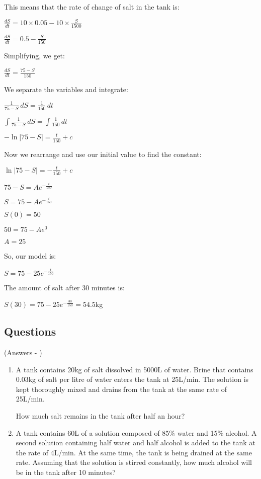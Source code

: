 \documentclass[../main.tex]{subfiles}
\begin{document}
This means that the rate of change of salt in the tank is:

$\frac{dS}{dt}=10 \times 0.05 - 10 \times \frac{S}{1500}$

$\frac{dS}{dt}=0.5 - \frac{S}{150}$

Simplifying, we get:

$\frac{dS}{dt}=\frac{75-S}{150}$

We separate the variables and integrate:

$\frac{1}{75-S}\,dS=\frac{1}{150}\,dt$

$\int \frac{1}{75-S}\,dS=\int \frac{1}{150}\,dt$

$-\ln|75-S|=\frac{t}{150}+c$

Now we rearrange and use our initial value to find the constant:

$\ln|75-S|=-\frac{t}{150}+c$

$75-S=Ae^{-\frac{t}{150}}$

$S=75-Ae^{-\frac{t}{150}}$

$S(0)=50$

$50=75-Ae^{0}$

$A=25$

So, our model is:

$S=75-25e^{-\frac{t}{150}}$

The amount of salt after 30 minutes is:

$S(30)=75-25e^{-\frac{30}{150}}=54.5$kg

\pagebreak

\subsection*{Questions}
(Answers - {\pageref{Mixing problems answers}})
\label{Mixing problems}
\begin{enumerate}[itemsep=0.7cm]
    \item 
    A tank contains 20kg of salt dissolved in 5000L of water. Brine that contains 0.03kg of salt per litre of water enters the tank at 25L/min. The solution is kept thoroughly mixed and drains from the tank at the same rate of 25L/min. 
    
    How much salt remains in the tank after half an hour?

    \item
    A tank contains 60L of a solution composed of 85$\%$ water and 15$\%$ alcohol. A second solution containing half water and half alcohol is added to the tank at the rate of 4L/min. At the same time, the tank is being drained at the same rate.
    Assuming that the solution is stirred constantly, how much alcohol will be in the tank after 10 minutes?

\end{enumerate}
\end{document}
